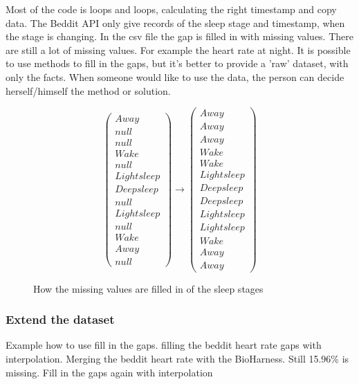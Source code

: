 
			Most of the code is loops and loops, calculating the right timestamp and copy data. 
			The Beddit API only give records of the sleep stage and timestamp, when the stage is changing.
			In the csv file the gap is filled in with missing values. There are still a lot of missing values. For example the heart rate at night. It is possible to use methods to fill in the gaps, but it's better to provide a 'raw' dataset, with only the facts. When someone would like to use the data, the person can decide herself/himself the method or solution.
			\begin{figure}[h!]
			\[ 
				\left(
				\begin{array}{c}
				Away \\
				null \\
				null \\
				Wake \\
				null \\
				Light sleep \\
				Deep sleep \\
				null \\
				Light sleep \\
				null \\
				Wake \\
				Away \\
				null
				\end{array}
				\right)
				\to
				\left(
				\begin{array}{c}
				Away \\
				Away \\
				Away \\
				Wake \\
				Wake \\
				Light sleep \\
				Deep sleep \\
				Deep sleep \\
				Light sleep \\
				Light sleep \\
				Wake \\
				Away \\
				Away 
				\end{array}
				\right)
			\] 
			\caption{How the missing values are filled in of the sleep stages}
		\end{figure}



		\subsubsection{Extend the dataset}
			Example how to use fill in the gaps.
			filling the beddit heart rate gaps with interpolation.
			Merging the beddit heart rate with the BioHarness. 
			Still 15.96\% is missing. 
			Fill in the gaps again with interpolation
		
